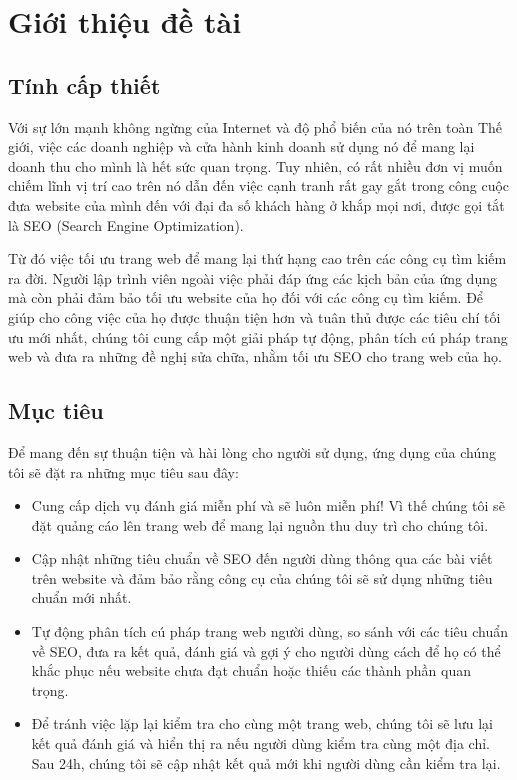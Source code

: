 \chapter{Giới thiệu đề tài}
\section{Tính cấp thiết}
Với sự lớn mạnh không ngừng của Internet và độ phổ biến của nó trên toàn Thế giới, việc các doanh nghiệp và cửa hành kinh doanh sử dụng nó để mang lại doanh thu cho mình là hết sức quan trọng. Tuy nhiên, có rất nhiều đơn vị muốn chiếm lĩnh vị trí cao trên nó dẫn đến việc cạnh tranh rất gay gắt trong công cuộc đưa website của mình đến với đại đa số khách hàng ở khắp mọi nơi, được gọi tắt là SEO (Search Engine Optimization).
\\\par
Từ đó việc tối ưu trang web để mang lại thứ hạng cao trên các công cụ tìm kiếm ra đời. Người lập trình viên ngoài việc phải đáp ứng các kịch bản của ứng dụng mà còn phải đảm bảo tối ưu website của họ đối với các công cụ tìm kiếm. Để giúp cho công việc của họ được thuận tiện hơn và tuân thủ được các tiêu chí tối ưu mới nhất, chúng tôi cung cấp một giải pháp tự động, phân tích cú pháp trang web và đưa ra những đề nghị sửa chữa, nhằm tối ưu SEO cho trang web của họ.
\section{Mục tiêu}
Để mang đến sự thuận tiện và hài lòng cho người sử dụng, ứng dụng của chúng tôi sẽ đặt ra những mục tiêu sau đây:
\begin{itemize}
	\item Cung cấp dịch vụ đánh giá miễn phí và sẽ luôn miễn phí! Vì thế chúng tôi sẽ đặt quảng cáo lên trang web để mang lại nguồn thu duy trì cho chúng tôi.
	\item Cập nhật những tiêu chuẩn về SEO đến người dùng thông qua các bài viết trên website và đảm bảo rằng công cụ của chúng tôi sẽ sử dụng những tiêu chuẩn mới nhất.
	\item Tự động phân tích cú pháp trang web người dùng, so sánh với các tiêu chuẩn về SEO, đưa ra kết quả, đánh giá và gợi ý cho người dùng cách để họ có thể khắc phục nếu website chưa đạt chuẩn hoặc thiếu các thành phần quan trọng.
	\item Để tránh việc lặp lại kiểm tra cho cùng một trang web, chúng tôi sẽ lưu lại kết quả đánh giá và hiển thị ra nếu người dùng kiểm tra cùng một địa chỉ. Sau 24h, chúng tôi sẽ cập nhật kết quả mới khi người dùng cần kiểm tra lại.
\end{itemize}

